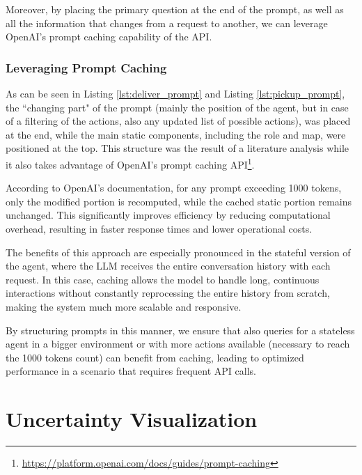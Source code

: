 Moreover, by placing the primary question at the end of the prompt, as well as all
the information that changes from a request to another, we can leverage OpenAI's
prompt caching capability of the API.

\subsubsection{Leveraging Prompt Caching}
\label{ssub:leveraging_prompt_caching} As can be seen in Listing
\ref{lst:deliver_prompt} and Listing \ref{lst:pickup_prompt}, the ``changing part"
of the prompt (mainly the position of the agent, but in case of a filtering of
the actions, also any updated list of possible actions), was placed at the end,
while the main static components, including the role and map, were positioned at
the top. This structure was the result of a literature analysis while it also takes
advantage of OpenAI's prompt caching API\footnote{\url{https://platform.openai.com/docs/guides/prompt-caching}}.

According to OpenAI's documentation, for any prompt exceeding 1000 tokens, only
the modified portion is recomputed, while the cached static portion remains unchanged.
This significantly improves efficiency by reducing computational overhead, resulting
in faster response times and lower operational costs.

The benefits of this approach are especially pronounced in the stateful version of
the agent, where the LLM receives the entire conversation history with each
request. In this case, caching allows the model to handle long, continuous interactions
without constantly reprocessing the entire history from scratch, making the
system much more scalable and responsive.

By structuring prompts in this manner, we ensure that also queries for a stateless
agent in a bigger environment or with more actions available (necessary to reach
the 1000 tokens count) can benefit from caching, leading to optimized
performance in a scenario that requires frequent API calls.

\section{Uncertainty Visualization}
\label{sec:uncertainty_visualization}

